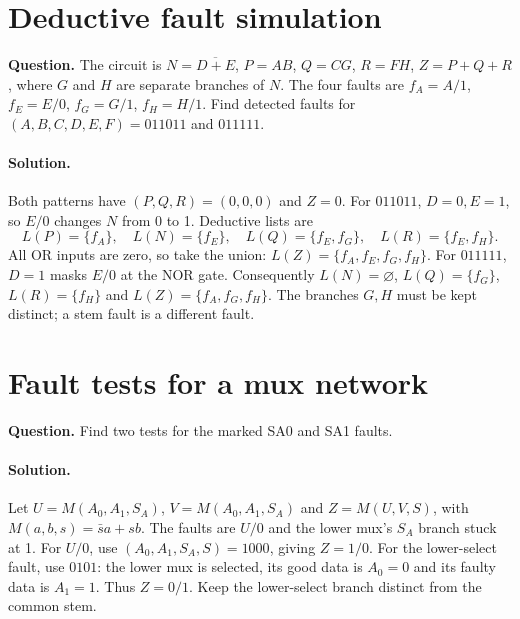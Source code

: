\documentclass[11pt]{article}
\newcommand{\sol}{\paragraph{Solution.}}
\begin{document}
\section{Deductive fault simulation}
\textbf{Question.} The circuit is
$N=\overline{D+E}$, $P=AB$, $Q=CG$, $R=FH$, $Z=P+Q+R$,
where $G$ and $H$ are separate branches of $N$.
The four faults are $f_A=A/1$, $f_E=E/0$, $f_G=G/1$, $f_H=H/1$.
Find detected faults for $(A,B,C,D,E,F)=011011$ and $011111$.
\begin{center}\end{center}

\sol Both patterns have $(P,Q,R)=(0,0,0)$ and $Z=0$.
For $011011$, $D=0,E=1$, so $E/0$ changes $N$ from 0 to 1.
Deductive lists are
\[
L(P)=\{f_A\},\quad L(N)=\{f_E\},\quad
L(Q)=\{f_E,f_G\},\quad L(R)=\{f_E,f_H\}.
\]
All OR inputs are zero, so take the union:
$L(Z)=\{f_A,f_E,f_G,f_H\}$.
For $011111$, $D=1$ masks $E/0$ at the NOR gate.
Consequently $L(N)=\varnothing$, $L(Q)=\{f_G\}$,
$L(R)=\{f_H\}$ and $L(Z)=\{f_A,f_G,f_H\}$.
The branches $G,H$ must be kept distinct; a stem fault is a different fault.
\section{Fault tests for a mux network}
\textbf{Question.} Find two tests for the marked SA0 and SA1 faults.
\begin{center}\end{center}
\sol Let $U=M(A_0,A_1,S_A)$, $V=M(A_0,A_1,S_A)$ and
$Z=M(U,V,S)$, with $M(a,b,s)=\bar s a+sb$.
The faults are $U/0$ and the lower mux's $S_A$ branch stuck at 1.
For $U/0$, use $(A_0,A_1,S_A,S)=1000$, giving $Z=1/0$.
For the lower-select fault, use $0101$: the lower mux is selected,
its good data is $A_0=0$ and its faulty data is $A_1=1$.
Thus $Z=0/1$. Keep the lower-select branch distinct from the common stem.
\end{document}
